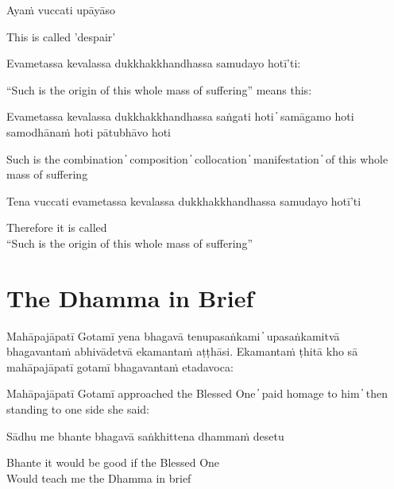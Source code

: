 Ayaṁ vuccati upāyāso

\begin{cprenglish}
  This is called 'despair'
\end{cprenglish}

Evametassa kevalassa dukkhakkhandhassa samudayo hotī’ti:

\begin{cprenglish}
  “Such is the origin of this whole mass of suffering” means this:
\end{cprenglish}

Evametassa kevalassa dukkhakkhandhassa saṅgati hoti  ̓  samāgamo hoti samodhānaṁ hoti pātubhāvo hoti

\begin{cprenglish}
  Such is the combination  ̓  composition  ̓  collocation  ̓  manifestation  ̓  of this whole mass of suffering
\end{cprenglish}

Tena vuccati evametassa kevalassa dukkhakkhandhassa samudayo hotī’ti

\begin{cprenglish}
  Therefore it is called\\
  “Such is the origin of this whole mass of suffering”
\end{cprenglish}


\clearpage

\section{The Dhamma in Brief}

\begin{leader}
\end{leader}

Mahāpajāpatī Gotamī yena bhagavā tenupasaṅkami  ̓  upasaṅkamitvā bhagavantaṁ abhivādetvā ekamantaṁ aṭṭhāsi. Ekamantaṁ ṭhitā kho sā mahāpajāpatī gotamī bhagavantaṁ etadavoca:

\begin{cprenglish}
  Mahāpajāpatī Gotamī approached the Blessed One  ̓  paid homage to him  ̓  then standing to one side she said:
\end{cprenglish}

Sādhu me bhante bhagavā saṅkhittena dhammaṁ desetu

\begin{cprenglish}
  Bhante it would be good if the Blessed One\\
  Would teach me the Dhamma in brief
\end{cprenglish}

